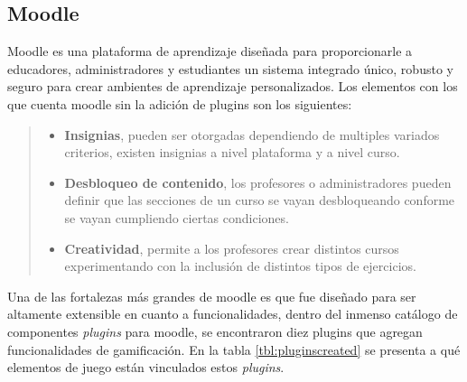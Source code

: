 \clearpage
\subsection*{Moodle}

 Moodle es una plataforma de aprendizaje diseñada para proporcionarle a educadores,
 administradores y estudiantes un sistema integrado único, robusto y seguro para crear
 ambientes de aprendizaje personalizados. Los elementos con los que cuenta moodle sin
 la adición de plugins son los siguientes:

 \begin{quote}
 \begin{itemize}
    \item {\bf Insignias}, pueden ser otorgadas dependiendo de multiples variados
                criterios, existen insignias a nivel plataforma y a nivel curso.

    \item {\bf Desbloqueo de contenido}, los profesores o administradores pueden
                definir que las secciones de un curso se vayan desbloqueando
                conforme se vayan cumpliendo ciertas condiciones.

    \item {\bf Creatividad}, permite a los profesores crear distintos cursos
                experimentando con la inclusión de distintos tipos de ejercicios.
 \end{itemize}
 \end{quote}

 \noindent Una de las fortalezas más grandes de moodle es que fue diseñado para ser altamente
 extensible en cuanto a funcionalidades, dentro del inmenso catálogo de componentes {\it plugins}
 para moodle, se encontraron diez plugins que agregan funcionalidades de gamificación. En la tabla
 \ref{tbl:pluginscreated} se presenta a qué elementos de juego están vinculados estos {\it plugins}.


